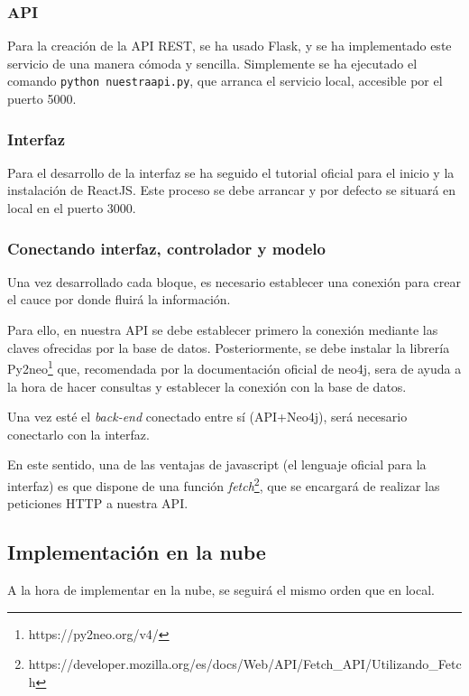 \subsubsection{API}

Para la creación de la API REST, se ha usado Flask, y se ha implementado este servicio de una manera cómoda y sencilla. Simplemente se ha ejecutado el comando \texttt{python nuestraapi.py}, que arranca el servicio local, accesible por el puerto 5000\cite{flaskinstall}.

\subsubsection{Interfaz}

Para el desarrollo de la interfaz se ha seguido el tutorial oficial para el inicio y la instalación de ReactJS\cite{reactinstall}. Este proceso se debe arrancar y por defecto se situará en local en el puerto 3000.

\subsubsection{Conectando interfaz, controlador y modelo}

Una vez desarrollado cada bloque, es necesario establecer una conexión para crear el cauce por donde fluirá la información.

Para ello, en nuestra API se debe establecer primero la conexión mediante las claves ofrecidas por la base de datos\cite{connectflaskneo4j}. Posteriormente, se debe instalar la librería Py2neo\footnote{https://py2neo.org/v4/} que, recomendada por la documentación oficial de neo4j, sera de ayuda a la hora de hacer consultas y establecer la conexión con la base de datos.

Una vez esté el \textit{back-end} conectado entre sí (API+Neo4j), será necesario conectarlo con la interfaz.

En este sentido, una de las ventajas de javascript (el lenguaje oficial para la interfaz) es que dispone de una función \textit{fetch}\footnote{https://developer.mozilla.org/es/docs/Web/API/Fetch\_API/Utilizando\_Fetch}, que se encargará de realizar las peticiones HTTP a nuestra API. 

\subsection{Implementación en la nube}

A la hora de implementar en la nube, se seguirá el mismo orden que en local. 

